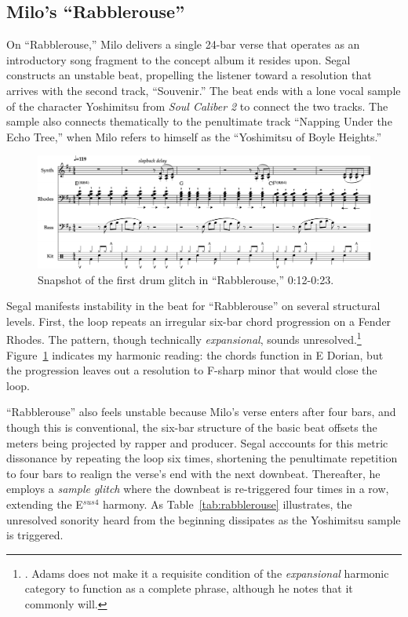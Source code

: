 \subsection*{\centering Milo's ``Rabblerouse''}

On ``Rabblerouse,'' Milo delivers a single 24-bar verse that operates as an introductory song fragment to the concept album it resides upon. Segal constructs an unstable beat, propelling the listener toward a resolution that arrives with the second track, ``Souvenir.'' The beat ends with a lone vocal sample of the character Yoshimitsu from \textit{Soul Caliber 2} to connect the two tracks. The sample also connects thematically to the penultimate track ``Napping Under the Echo Tree,'' when Milo refers to himself as the ``Yoshimitsu of Boyle Heights.''

    \begin{figure}[ht]
        \centering
        \includegraphics[width=\textwidth]{images/figures/chp 02/012023rabblefirstglitch.pdf}
        \caption{Snapshot of the first drum glitch in ``Rabblerouse,'' 0:12-0:23.}
        \label{fig:rabblefirstglitch}
    \end{figure}

Segal manifests instability in the beat for ``Rabblerouse'' on several structural levels. First, the loop repeats an irregular six-bar chord progression on a Fender Rhodes. The pattern, though technically \emph{expansional}, sounds unresolved.\footnote{\cite{kyleadamsHarmonicSyntacticMotivic2020}. Adams does not make it a requisite condition of the \emph{expansional} harmonic category to function as a complete phrase, although he notes that it commonly will.} Figure~\ref{fig:rabblefirstglitch} indicates my harmonic reading: the chords function in E Dorian, but the progression leaves out a resolution to F-sharp minor that would close the loop.

``Rabblerouse'' also feels unstable because Milo's verse enters after four bars, and though this is conventional, the six-bar structure of the basic beat offsets the meters being projected by rapper and producer. Segal acccounts for this metric dissonance by repeating the loop six times, shortening the penultimate repetition to four bars to realign the verse's end with the next downbeat. Thereafter, he employs a \emph{sample glitch} where the downbeat is re-triggered four times in a row, extending the E$^{sus4}$ harmony. As Table~\ref{tab:rabblerouse} illustrates, the unresolved sonority heard from the beginning dissipates as the Yoshimitsu sample is triggered.


